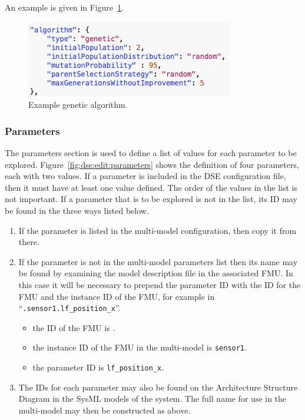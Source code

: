 An example is given in Figure~\ref{fig:dse:edit:algorithm}.

\begin{figure}[ht]
	\centering
	\includegraphics[scale=0.55]{figures/dse/config-algorithm}
	\caption{Example genetic algorithm.}\label{fig:dse:edit:algorithm}
\end{figure}
%
%
\subsubsection{Parameters}\label{sec:dse:edit:parameters}
The parameters section is used to define a list of values for each parameter to be explored.  Figure~\ref{fig:dse:edit:parameters} shows the definition of four parameters, each with two values. If a parameter is included in the DSE configuration file, then it must have at least one value defined.  The order of the values in the list is not important.  If a parameter that is to be explored is not in the list, its ID may be found in the three ways listed below.
%
%
%
\begin{enumerate}
	\item If the parameter is listed in the multi-model configuration, then copy it from there.
	\item If the parameter is not in the multi-model parameters list then its name may be found by examining the model description file in the associated FMU.  In this case it will be necessary to prepend the parameter ID with the ID for the FMU and the instance ID of the FMU, for example in ``\texttt{.sensor1.lf\_position\_x}''.
	\begin{itemize}
	\item  the ID of the FMU is \texttt{}.
	\item  the instance ID of the FMU in the multi-model is \texttt{sensor1}.
	\item  the parameter ID is \texttt{lf\_position\_x}.
	\end{itemize}
	\item The IDs for each parameter may also be found on the Architecture Structure Diagram in the SysML models of the system.  The  full name for use in the multi-model may then be constructed as above.
\end{enumerate}

